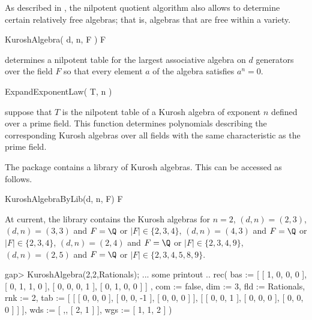 
As described in \cite{Eic11}, the nilpotent quotient algorithm also allows
to determine certain relatively free algebras; that is, algebras that are
free within a variety.


\> KuroshAlgebra( d, n, F ) F

determines a nilpotent table for the largest associative algebra on
$d$ generators over the field $F$ so that every element $a$ of the 
algebra satisfies $a^n = 0$.

\> ExpandExponentLaw( T, n )

suppose that $T$ is the nilpotent table of a Kurosh algebra of exponent
$n$ defined over a prime field. This function determines polynomials 
describing the corresponding Kurosh algebras over all fields with the same 
characteristic as the prime field.


The package contains a library of Kurosh algebras. This can be accessed
as follows.

\> KuroshAlgebraByLib(d, n, F) F

At current, the library contains the Kurosh algebras for 
$n=2$, 
$(d,n) = (2,3)$, 
$(d,n) = (3,3)$ and $F = \Q$ or $|F| \in \{2,3,4\}$,
$(d,n) = (4,3)$ and $F = \Q$ or $|F| \in \{2,3,4\}$,
$(d,n) = (2,4)$ and $F = \Q$ or $|F| \in \{2,3,4,9\}$,
$(d,n) = (2,5)$ and $F = \Q$ or $|F| \in \{2,3,4,5,8,9\}$.


\beginexample
gap> KuroshAlgebra(2,2,Rationals);
... some printout ..
rec( bas := [ [ 1, 0, 0, 0 ], [ 0, 1, 1, 0 ], [ 0, 0, 0, 1 ], [ 0, 1, 0, 0 ] ]
    , com := false, dim := 3, fld := Rationals, rnk := 2, 
  tab := [ [ [ 0, 0, 0 ], [ 0, 0, -1 ], [ 0, 0, 0 ] ], 
      [ [ 0, 0, 1 ], [ 0, 0, 0 ], [ 0, 0, 0 ] ] ], wds := [ ,, [ 2, 1 ] ], 
  wgs := [ 1, 1, 2 ] )
\endexample


